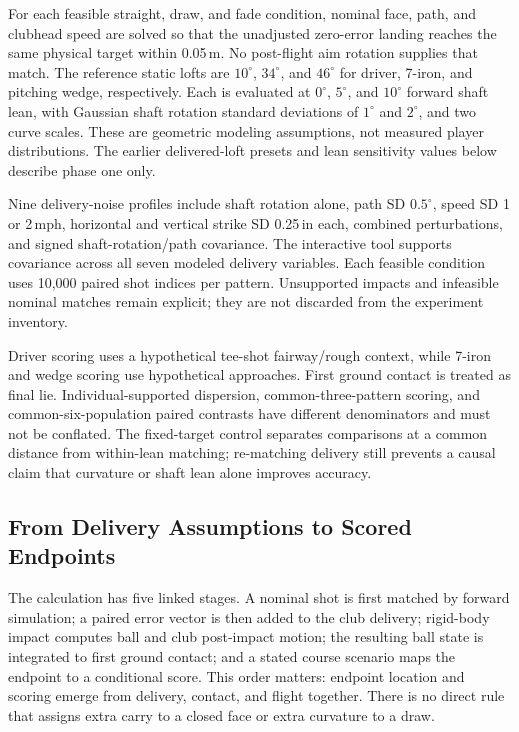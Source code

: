 \documentclass[11pt,letterpaper]{article}
\begin{document}
For each feasible straight, draw, and fade condition, nominal face, path, and
clubhead speed are solved so that the unadjusted zero-error landing reaches the
same physical target within 0.05\,m. No post-flight aim rotation supplies that
match. The reference static lofts are $10^\circ$, $34^\circ$, and $46^\circ$
for driver, 7-iron, and pitching wedge, respectively. Each is evaluated at
$0^\circ$, $5^\circ$, and $10^\circ$ forward shaft lean, with Gaussian shaft
rotation standard deviations of $1^\circ$ and $2^\circ$, and two curve scales.
These are geometric modeling assumptions, not measured player distributions.
The earlier delivered-loft presets and lean sensitivity values below describe
phase one only.

Nine delivery-noise profiles include shaft rotation alone, path SD
$0.5^\circ$, speed SD 1 or 2\,mph, horizontal and vertical strike SD
0.25\,in each, combined perturbations, and signed shaft-rotation/path
covariance. The interactive tool supports covariance across all seven modeled
delivery variables. Each feasible condition uses 10,000 paired shot indices
per pattern. Unsupported impacts and infeasible nominal matches remain explicit;
they are not discarded from the experiment inventory.

Driver scoring uses a hypothetical tee-shot fairway/rough context, while
7-iron and wedge scoring use hypothetical approaches. First ground contact is
treated as final lie. Individual-supported dispersion, common-three-pattern
scoring, and common-six-population paired contrasts have different denominators
and must not be conflated. The fixed-target control separates comparisons at a
common distance from within-lean matching; re-matching delivery still prevents
a causal claim that curvature or shaft lean alone improves accuracy.

\subsection{From Delivery Assumptions to Scored Endpoints}
The calculation has five linked stages. A nominal shot is first matched by
forward simulation; a paired error vector is then added to the club delivery;
rigid-body impact computes ball and club post-impact motion; the resulting ball
state is integrated to first ground contact; and a stated course scenario maps
the endpoint to a conditional score. This order matters: endpoint location and
scoring emerge from delivery, contact, and flight together. There is no direct
rule that assigns extra carry to a closed face or extra curvature to a draw.
\end{document}
